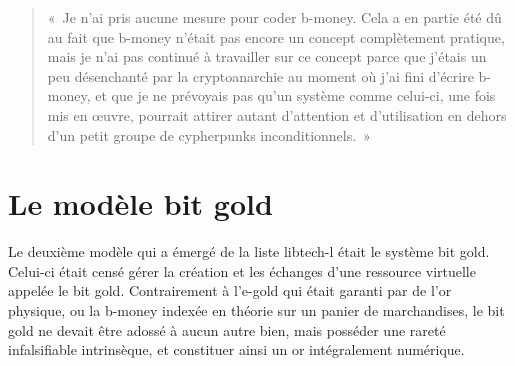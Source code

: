 \begin{quote}
«~Je n'ai pris aucune mesure pour coder b-money. Cela a en partie été dû au fait que b-money n'était pas encore un concept complètement pratique, mais je n'ai pas continué à travailler sur ce concept parce que j'étais un peu désenchanté par la cryptoanarchie au moment où j'ai fini d'écrire b-money, et que je ne prévoyais pas qu'un système comme celui-ci, une fois mis en œuvre, pourrait attirer autant d'attention et d'utilisation en dehors d'un petit groupe de cypherpunks inconditionnels.~»
\end{quote}


\section*{Le modèle bit gold} %

Le deuxième modèle qui a émergé de la liste libtech-l était le système bit gold. Celui-ci était censé gérer la création et les échanges d'une ressource virtuelle appelée le bit gold. Contrairement à l'e-gold qui était garanti par de l'or physique, ou la b-money indexée en théorie sur un panier de marchandises, le bit gold ne devait être adossé à aucun autre bien, mais posséder une rareté infalsifiable intrinsèque, et constituer ainsi un or intégralement numérique. %

